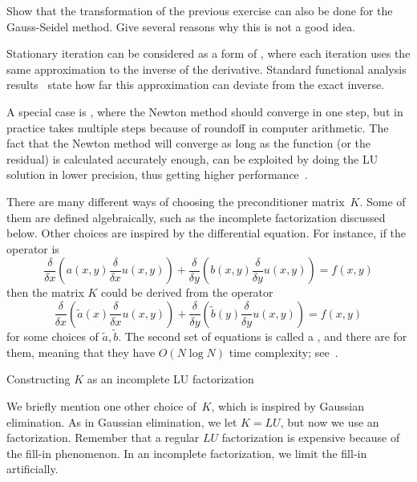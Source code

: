 \begin{exercise}
  Show that the transformation of the previous exercise can also be
  done for the Gauss-Seidel method. Give several reasons why this is
  not a good idea.
\end{exercise}

\begin{remark}
  Stationary iteration can be considered as a form of
  , where each iteration uses the
  same approximation to the inverse of the derivative. Standard
  functional analysis results~\cite{Kantorovich:functional} state how
  far this approximation can deviate from the exact inverse.

  A special case is , where the Newton
  method should converge in one step, but in practice takes multiple
  steps because of roundoff in computer arithmetic. The fact that the
  Newton method will converge as long as the function (or the
  residual) is calculated accurately enough, can be exploited by doing
  the LU solution in lower precision, thus getting higher
  performance~\cite{Dongarra:mixed-refinement}.
\end{remark}

There are  many different ways of choosing the preconditioner
matrix~$K$. Some of them are defined algebraically, such as the
incomplete factorization discussed below. Other choices are inspired
by the differential equation. For instance, if the operator is
\[ \frac\delta{\delta x}(a(x,y)\frac\delta{\delta x}u(x,y)) +
   \frac\delta{\delta y}(b(x,y)\frac\delta{\delta y}u(x,y)) = f(x,y)
\]
then the matrix $K$ could be derived from the operator
\[ \frac\delta{\delta x}(\tilde a(x)\frac\delta{\delta x}u(x,y)) +
   \frac\delta{\delta y}(\tilde b(y)\frac\delta{\delta y}u(x,y)) = f(x,y)
\]
for some choices of $\tilde a,\tilde b$. The second set of equations
is called a , and there are
 for them, meaning that they have $O(N\log N)$
time complexity; see~\cite{Wi:fastseparable}.

 {Constructing $K$ as an incomplete LU factorization}
\label{sec:ilu}

We briefly mention one other choice of~$K$, which is inspired by
Gaussian elimination. As in Gaussian elimination, we let $K=LU$, but
now we use an  factorization. Remember that a
regular $LU$ factorization is expensive because of the fill-in
phenomenon. In an incomplete factorization, we limit the fill-in
artificially.


